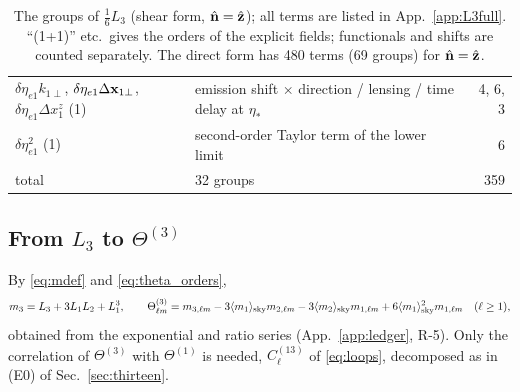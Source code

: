 \begin{table}[t]
\begin{tabular}{@{}p{}p{}r@{}}
$\delta\eta_{e1}k_{1\perp}$, $\delta\eta_{e1}\Delta\mathbf x_{1\perp}$, $\delta\eta_{e1}\Delta x_1^z$ (1) & emission shift $\times$ direction / lensing / time delay at $\eta_*$ & 4, 6, 3\\
$\delta\eta_{e1}^2$ (1) & second-order Taylor term of the lower limit & 6\\ \hline
total & 32 groups & 359\\ \hline
\end{tabular}
\caption{The groups of $\tfrac16L_3$ (shear form, $\hat{\mathbf n}=\hat{\mathbf z}$); all terms are listed in App.~\ref{app:L3full}.
``(1+1)'' etc.\ gives the orders of the explicit fields; functionals and shifts are counted separately.  The direct form has
480 terms (69 groups) for $\hat{\mathbf n}=\hat{\mathbf z}$.}
\label{tab:L3groups}
\end{table}

\subsection{From \texorpdfstring{$L_3$}{L3} to \texorpdfstring{$\Theta^{(3)}$}{Theta3}}
\label{sec:theta3}
By \eqref{eq:mdef} and \eqref{eq:theta_orders},
\begin{equation}
m_3=L_3+3L_1L_2+L_1^3,\qquad
\Theta^{(3)}_{\ell m}=m_{3,\ell m}-3\langle m_1\rangle_{\rm sky}m_{2,\ell m}-3\langle m_2\rangle_{\rm sky}m_{1,\ell m}+6\langle m_1\rangle_{\rm sky}^2m_{1,\ell m}\quad(\ell\ge1),
\label{eq:theta3}
\end{equation}
obtained from the exponential and ratio series (App.~\ref{app:ledger}, R-5).  Only the correlation of
$\Theta^{(3)}$ with $\Theta^{(1)}$ is needed, $C^{(13)}_\ell$ of \eqref{eq:loops}, decomposed as in (E0) of Sec.~\ref{sec:thirteen}.

